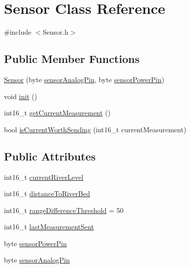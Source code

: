 \hypertarget{class_sensor}{}\section{Sensor Class Reference}
\label{class_sensor}


{\ttfamily \#include $<$Sensor.\+h$>$}

\subsection*{Public Member Functions}
\begin{DoxyCompactItemize}
\item 
\mbox{\hyperlink{class_sensor_a135f905806f9234a4e867a7760d6188c}{Sensor}} (byte \mbox{\hyperlink{class_sensor_a713dcc4e025205c864c44fb23b22ffd8}{sensor\+Analog\+Pin}}, byte \mbox{\hyperlink{class_sensor_a151237329ac720b0edf097ae2bbf873e}{sensor\+Power\+Pin}})
\item 
void \mbox{\hyperlink{class_sensor_a84bc35cfba92eb579bc311b3c8b2980d}{init}} ()
\item 
int16\+\_\+t \mbox{\hyperlink{class_sensor_ae259133b490e86863feaf97fe7b10106}{get\+Current\+Measurement}} ()
\item 
bool \mbox{\hyperlink{class_sensor_aa67cf318ae1bde8027b723d2c85e56dd}{is\+Current\+Worth\+Sending}} (int16\+\_\+t current\+Measurement)
\end{DoxyCompactItemize}
\subsection*{Public Attributes}
\begin{DoxyCompactItemize}
\item 
int16\+\_\+t \mbox{\hyperlink{class_sensor_a5276355eb01eb80e9e47f6f793d59f71}{current\+River\+Level}}
\item 
int16\+\_\+t \mbox{\hyperlink{class_sensor_a1d3d56b925cb8a8f13c8ad8356b7202a}{distance\+To\+River\+Bed}}
\item 
int16\+\_\+t \mbox{\hyperlink{class_sensor_aac74d0c04eaadb3ed7f48fc9ad1ea379}{range\+Difference\+Threshold}} = 50
\item 
int16\+\_\+t \mbox{\hyperlink{class_sensor_a76b4a42e92d57f14efc76a5f51cdea18}{last\+Measurement\+Sent}}
\item 
byte \mbox{\hyperlink{class_sensor_a151237329ac720b0edf097ae2bbf873e}{sensor\+Power\+Pin}}
\item 
byte \mbox{\hyperlink{class_sensor_a713dcc4e025205c864c44fb23b22ffd8}{sensor\+Analog\+Pin}}
\end{DoxyCompactItemize}



